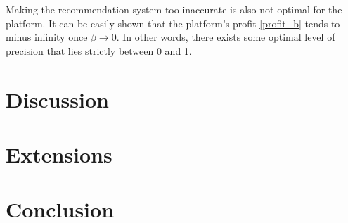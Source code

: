 \documentclass[a4paper]{article}
\begin{document}
Making the recommendation system too inaccurate is also not optimal for the platform. It can be easily shown that the platform's profit \eqref{profit_b} tends to minus infinity once $\beta \to 0$. In other words, there exists some optimal level of precision that lies strictly between 0 and 1.
	\section{Discussion}
	\section{Extensions}
	\section{Conclusion}
	\newpage
	{}
	
\end{document}
